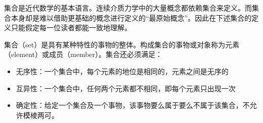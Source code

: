 \documentclass[main.tex]{subfiles}
\begin{document}
集合是近代数学的基本语言。连续介质力学中的大量概念都依赖集合来定义。而集合本身却是难以借助更基础的概念进行定义的“最原始概念”。因此在下述集合的定义只能假定每一位读者都能一致地理解。
\begin{definition}[集合]\label{def:II.1.1}
集合（set）是具有某种特性的事物的整体。构成集合的事物或对象称为元素（element）或成员（member）。集合还必须满足：
\begin{itemize}
    \item 无序性：一个集合中，每个元素的地位是相同的，元素之间是无序的
    \item 互异性：一个集合中，任何两个元素都不相同，即每个元素只出现一次
    \item 确定性：给定一个集合及一个事物，该事物要么属于要么不属于该集合，不允许模棱两可。
\end{itemize}
\end{definition}
\end{document}
